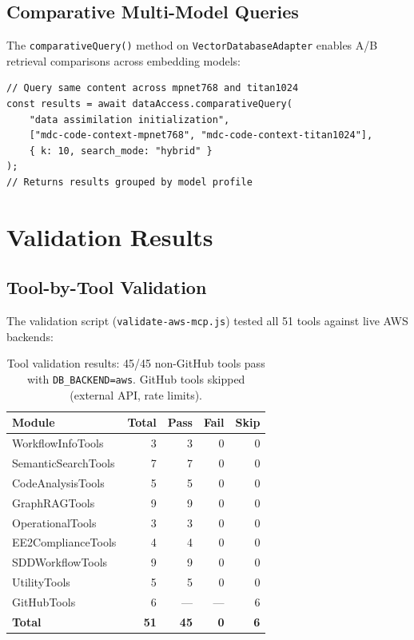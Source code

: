 \documentclass[11pt,letterpaper]{article}
\begin{document}
\subsection{Comparative Multi-Model Queries}

The \texttt{comparativeQuery()} method on \texttt{VectorDatabaseAdapter}
enables A/B retrieval comparisons across embedding models:

\begin{lstlisting}[caption={Comparative query across embedding models.}]
// Query same content across mpnet768 and titan1024
const results = await dataAccess.comparativeQuery(
    "data assimilation initialization",
    ["mdc-code-context-mpnet768", "mdc-code-context-titan1024"],
    { k: 10, search_mode: "hybrid" }
);
// Returns results grouped by model profile
\end{lstlisting}

\section{Validation Results}
\label{sec:validation}

\subsection{Tool-by-Tool Validation}

The validation script (\texttt{validate-aws-mcp.js}) tested all 51 tools
against live AWS backends:

\begin{table}[H]
\centering
\footnotesize
\begin{tabular}{@{}lrrrr@{}}
\toprule
\textbf{Module} & \textbf{Total} & \textbf{Pass} & \textbf{Fail} & \textbf{Skip} \\
\midrule
WorkflowInfoTools & 3 & 3 & 0 & 0 \\
SemanticSearchTools & 7 & 7 & 0 & 0 \\
CodeAnalysisTools & 5 & 5 & 0 & 0 \\
GraphRAGTools & 9 & 9 & 0 & 0 \\
OperationalTools & 3 & 3 & 0 & 0 \\
EE2ComplianceTools & 4 & 4 & 0 & 0 \\
SDDWorkflowTools & 9 & 9 & 0 & 0 \\
UtilityTools & 5 & 5 & 0 & 0 \\
GitHubTools & 6 & --- & --- & 6 \\
\midrule
\textbf{Total} & \textbf{51} & \textbf{45} & \textbf{0} & \textbf{6} \\
\bottomrule
\end{tabular}
\caption{Tool validation results: 45/45 non-GitHub tools pass with
\texttt{DB\_BACKEND=aws}. GitHub tools skipped (external API, rate limits).}
\label{tab:validation}
\end{table}
\end{document}
